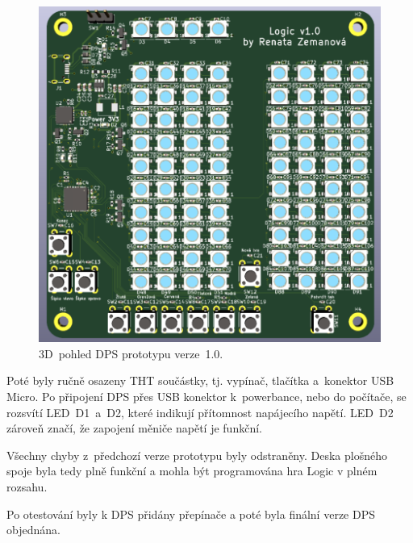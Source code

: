   \begin{figure}[!h]
    \begin{center}
      \includegraphics[scale=0.65]{obrazky/Verze1_3D_pohled.png}
    \end{center}
    \caption[3D~pohled DPS prototypu verze~1.0]{3D~pohled DPS prototypu verze~1.0.}
  \end{figure}

  Poté byly ručně osazeny THT součástky, tj. vypínač, tlačítka a~konektor USB Micro. Po připojení DPS přes USB konektor k~powerbance, 
  nebo do počítače, se rozsvítí LED~D1~a~D2, které indikují přítomnost napájecího napětí. LED~D2 zároveň značí, že zapojení měniče
  napětí je funkční.

  Všechny chyby z~předchozí verze prototypu byly odstraněny. Deska plošného spoje byla tedy plně funkční a mohla být programována hra Logic v plném rozsahu.
  
  Po otestování byly k DPS přidány přepínače a poté byla finální verze DPS objednána.

  

 
  




